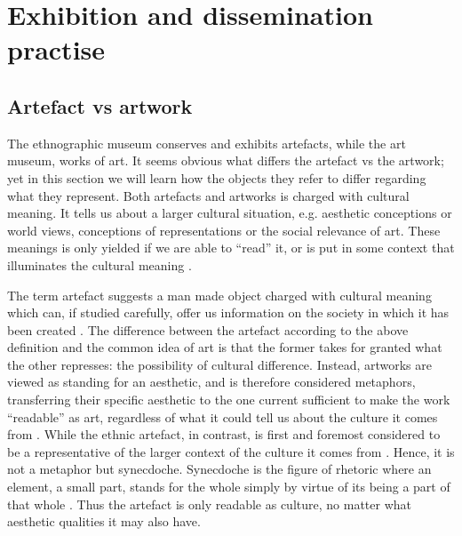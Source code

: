 \section{Exhibition and dissemination practise}

\subsection{Artefact vs artwork}
The ethnographic museum conserves and exhibits artefacts, while the art museum, works of art. It seems obvious what differs the artefact vs the artwork; yet in this section we will learn how the objects they refer to differ regarding what they represent. Both artefacts and artworks is charged with cultural meaning. It tells us about a larger cultural situation, e.g. aesthetic conceptions or world views, conceptions of representations or the social relevance of art. These meanings is only yielded if we are able to “read” it, or is put in some context that illuminates the cultural meaning \autocite[p. 206]{Thi_book}.

The term artefact suggests a man made object charged with cultural meaning which can, if studied carefully, offer us information on the society in which it has been created \autocite[p. 205]{Thi_book}. The difference between the artefact according to the above definition and the common idea of art is that the former takes for granted what the other represses: the possibility of cultural difference. Instead, artworks are viewed as standing for an aesthetic, and is therefore considered metaphors, transferring their specific aesthetic to the one current sufficient to make the work “readable” as art, regardless of what it could tell us about the culture it comes from \autocite[p. 206]{Thi_book}. While the ethnic artefact, in contrast, is first and foremost considered to be a representative of the larger context of the culture it comes from \autocite[p. 206]{Thi_book}. Hence, it is not a metaphor but synecdoche. Synecdoche is the figure of rhetoric where an element, a small part, stands for the whole simply by virtue of its being a part of that whole \autocite[p. 206]{Thi_book}. Thus the artefact is only readable as culture, no matter what aesthetic qualities it may also have.


